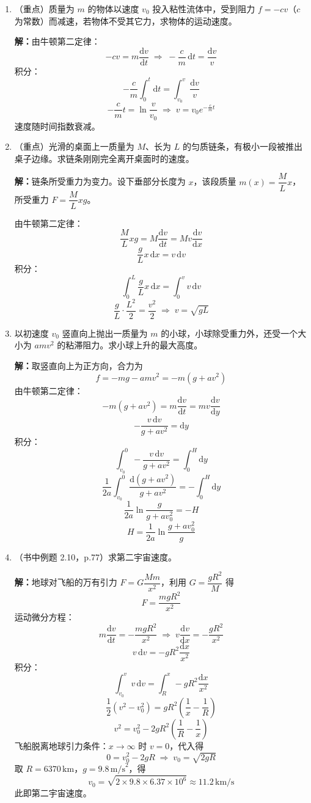 \documentclass{ctexart}
\begin{document}
\begin{enumerate}
消去 $t$：$t = \dfrac{y}{v_0}$，代入得
\[
x = \frac{F_0}{6m}\left(\frac{y}{v_0}\right)^{3} = \frac{F_0}{6m v_0^{3}}\,y^{3}
\]
轨迹为立方抛物线。

\item（重点）质量为 $m$ 的物体以速度 $v_0$ 投入粘性流体中，受到阻力 $f = -cv$（$c$ 为常数）而减速，若物体不受其它力，求物体的运动速度。

\textbf{解：}由牛顿第二定律：
\[
-cv = m\frac{\mathrm{d}v}{\mathrm{d}t} \;\Longrightarrow\; -\frac{c}{m}\,\mathrm{d}t = \frac{\mathrm{d}v}{v}
\]
积分：
\[
-\frac{c}{m}\int_{0}^{t} \mathrm{d}t = \int_{v_0}^{v} \frac{\mathrm{d}v}{v}
\]
\[
-\frac{c}{m}t = \ln\frac{v}{v_0} \;\Longrightarrow\; v = v_0 e^{-\frac{c}{m}t}
\]
速度随时间指数衰减。

\item（重点）光滑的桌面上一质量为 $M$、长为 $L$ 的匀质链条，有极小一段被推出桌子边缘。求链条刚刚完全离开桌面时的速度。

\textbf{解：}链条所受重力为变力。设下垂部分长度为 $x$，该段质量 $m(x) = \dfrac{M}{L}x$，所受重力 $F = \dfrac{M}{L}xg$。

由牛顿第二定律：
\[
\frac{M}{L}xg = M\frac{\mathrm{d}v}{\mathrm{d}t} = Mv\frac{\mathrm{d}v}{\mathrm{d}x}
\]
\[
\frac{g}{L}x\,\mathrm{d}x = v\,\mathrm{d}v
\]
积分：
\[
\int_{0}^{L} \frac{g}{L}x\,\mathrm{d}x = \int_{0}^{v} v\,\mathrm{d}v
\]
\[
\frac{g}{L}\cdot\frac{L^{2}}{2} = \frac{v^{2}}{2} \;\Longrightarrow\; v = \sqrt{gL}
\]

\item 以初速度 $v_0$ 竖直向上抛出一质量为 $m$ 的小球，小球除受重力外，还受一个大小为 $amv^{2}$ 的粘滞阻力。求小球上升的最大高度。

\textbf{解：}取竖直向上为正方向，合力为
\[
f = -mg - amv^{2} = -m(g + av^{2})
\]
由牛顿第二定律：
\[
-m(g + av^{2}) = m\frac{\mathrm{d}v}{\mathrm{d}t} = mv\frac{\mathrm{d}v}{\mathrm{d}y}
\]
\[
-\frac{v\,\mathrm{d}v}{g + av^{2}} = \mathrm{d}y
\]
积分：
\[
\int_{v_0}^{0} -\frac{v\,\mathrm{d}v}{g + av^{2}} = \int_{0}^{H} \mathrm{d}y
\]
\[
\frac{1}{2a}\int_{v_0}^{0} \frac{\mathrm{d}(g + av^{2})}{g + av^{2}} = -\int_{0}^{H} \mathrm{d}y
\]
\[
\frac{1}{2a}\ln\frac{g}{g + av_0^{2}} = -H
\]
\[
H = \frac{1}{2a}\ln\frac{g + av_0^{2}}{g}
\]

\item（书中例题 2.10，p.77）求第二宇宙速度。

\textbf{解：}地球对飞船的万有引力 $F = G\dfrac{Mm}{x^{2}}$，利用 $G = \dfrac{gR^{2}}{M}$ 得
\[
F = \frac{mgR^{2}}{x^{2}}
\]
运动微分方程：
\[
m\frac{\mathrm{d}v}{\mathrm{d}t} = -\frac{mgR^{2}}{x^{2}} \;\Longrightarrow\; v\frac{\mathrm{d}v}{\mathrm{d}x} = -\frac{gR^{2}}{x^{2}}
\]
\[
v\,\mathrm{d}v = -gR^{2}\frac{\mathrm{d}x}{x^{2}}
\]
积分：
\[
\int_{v_0}^{v} v\,\mathrm{d}v = \int_{R}^{x} -gR^{2}\frac{\mathrm{d}x}{x^{2}}
\]
\[
\frac12(v^{2} - v_0^{2}) = gR^{2}\left(\frac{1}{x} - \frac{1}{R}\right)
\]
\[
v^{2} = v_0^{2} - 2gR^{2}\left(\frac{1}{R} - \frac{1}{x}\right)
\]
飞船脱离地球引力条件：$x \to \infty$ 时 $v = 0$，代入得
\[
0 = v_0^{2} - 2gR \;\Longrightarrow\; v_0 = \sqrt{2gR}
\]
取 $R = 6370\,\text{km}$，$g = 9.8\,\text{m/s}^{2}$，得
\[
v_0 = \sqrt{2 \times 9.8 \times 6.37\times10^{6}} \approx 11.2\,\text{km/s}
\]
此即第二宇宙速度。


\end{enumerate}
\end{document}
